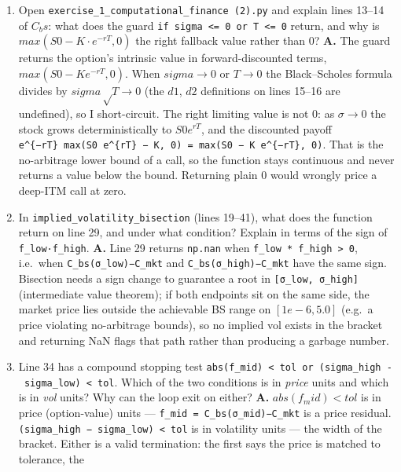 \documentclass[
  11pt,
]{article}
\begin{document}
\begin{enumerate}
\def\labelenumi{\arabic{enumi}.}
\item
  Open \texttt{exercise\_1\_computational\_finance\ (2).py} and explain
  lines 13--14 of \(C_bs\): what does the guard
  \texttt{if\ sigma\ \textless{}=\ 0\ or\ T\ \textless{}=\ 0} return,
  and why is \(max(S0 − K·e^{−rT}, 0)\) the right fallback value rather
  than \(0\)? \textbf{A.} The guard returns the option's intrinsic value
  in forward-discounted terms, \(max(S0 − K e^{−rT}, 0)\). When
  \(sigma → 0\) or \(T → 0\) the Black--Scholes formula divides by
  \(sigma√T → 0\) (the \(d1\), \(d2\) definitions on lines 15--16 are
  undefined), so I short-circuit. The right limiting value is not \(0\):
  as \(σ→0\) the stock grows deterministically to \(S0 e^{rT}\), and the
  discounted payoff
  \texttt{e\^{}\{−rT\}\ max(S0\ e\^{}\{rT\}\ −\ K,\ 0)\ =\ max(S0\ −\ K\ e\^{}\{−rT\},\ 0)}.
  That is the no-arbitrage lower bound of a call, so the function stays
  continuous and never returns a value below the bound. Returning plain
  \(0\) would wrongly price a deep-ITM call at zero.
\item
  In \texttt{implied\_volatility\_bisection} (lines 19--41), what does
  the function return on line 29, and under what condition? Explain in
  terms of the sign of \texttt{f\_low·f\_high}. \textbf{A.} Line 29
  returns \texttt{np.nan} when
  \texttt{f\_low\ *\ f\_high\ \textgreater{}\ 0}, i.e.~when
  \texttt{C\_bs(σ\_low)−C\_mkt} and \texttt{C\_bs(σ\_high)−C\_mkt} have
  the same sign. Bisection needs a sign change to guarantee a root in
  \texttt{{[}σ\_low,\ σ\_high{]}} (intermediate value theorem); if both
  endpoints sit on the same side, the market price lies outside the
  achievable BS range on \([1e-6, 5.0]\) (e.g.~a price violating
  no-arbitrage bounds), so no implied vol exists in the bracket and
  returning NaN flags that path rather than producing a garbage number.
\item
  Line 34 has a compound stopping test
  \texttt{abs(f\_mid)\ \textless{}\ tol\ or\ (sigma\_high\ -\ sigma\_low)\ \textless{}\ tol}.
  Which of the two conditions is in \emph{price} units and which is in
  \emph{vol} units? Why can the loop exit on either? \textbf{A.}
  \(abs(f_mid) < tol\) is in price (option-value) units ---
  \texttt{f\_mid\ =\ C\_bs(σ\_mid)−C\_mkt} is a price residual.
  \texttt{(sigma\_high\ −\ sigma\_low)\ \textless{}\ tol} is in
  volatility units --- the width of the bracket. Either is a valid
  termination: the first says the price is matched to tolerance, the

\end{enumerate}
\end{document}
